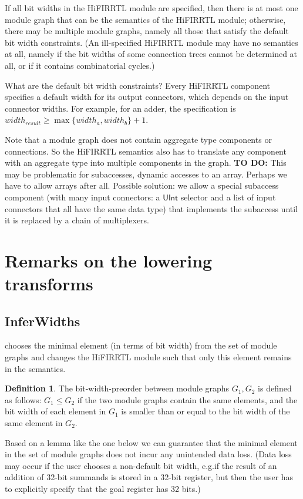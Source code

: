 \documentclass{article}
\theoremstyle{definition}
\newtheorem{definition}{Definition}
\begin{document}
\noindent
If all bit widths in the HiFIRRTL module are specified,
then there is at most one module graph that can be the semantics of the HiFIRRTL module;
otherwise, there may be multiple module graphs,
namely all those that satisfy the default bit width constraints.
(An ill-specified HiFIRRTL module may have no semantics at all,
namely if the bit widths of some connection trees cannot be determined at all,
or if it contains combinatorial cycles.)

What are the default bit width constraints?
Every HiFIRRTL component specifies a default width for its output connectors,
which depends on the input connector widths.
For example, for an adder, the specification is
$\mathit{width}_\mathit{result} \geq \max \{\mathit{width}_a, \mathit{width}_b\} + 1$.

Note that a module graph does not contain aggregate type components or connections.
So the HiFIRRTL semantics also has to translate any component with an aggregate type
into multiple components in the graph.
\textbf{TO DO:} This may be problematic for subaccesses, dynamic accesses to an array.
Perhaps we have to allow arrays after all.
Possible solution: we allow a special subaccess component
(with many input connectors: a $\mathsf{UInt}$ selector and a list of input connectors that all have the same data type)
that implements the subaccess
until it is replaced by a chain of multiplexers.

\section{Remarks on the lowering transforms}

\subsection{InferWidths}

chooses the minimal element (in terms of bit width) from the set of module graphs and changes the HiFIRRTL module such that only this element remains in the semantics.

\begin{definition}
	The bit-width-preorder between module graphs $G_1, G_2$ is defined as follows:
	$G_1 \leq G_2$ if the two module graphs contain the same elements,
	and the bit width of each element in $G_1$ is smaller than or equal to the bit width of the same element in $G_2$.
\end{definition}

\noindent
Based on a lemma like the one below
we can guarantee that the minimal element in the set of module graphs does not incur any unintended data loss.
(Data loss may occur if the user chooses a non-default bit width,
e.g.\@ if the result of an addition of 32-bit summands is stored in a 32-bit register,
but then the user has to explicitly specify that the goal register has 32 bits.)
\end{document}
